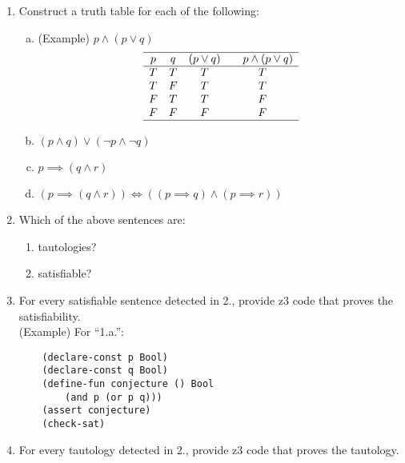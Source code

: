 \documentclass[11pt]{article}
\begin{document}
\begin{enumerate}[1.]
	\item Construct a truth table for each of the following:
	
	\begin{enumerate}[a.]
		\item (Example) $p \land (p \lor q)$
		\begin{displaymath}
		\begin{array}{cccc} \hline
		p & q & (p \lor q) & \quad p \land (p \lor q)\\
		\hline
		T & T & T & T\\
		T & F & T & T\\
		F & T & T & F\\
		F & F & F & F\\
		\hline \end{array}
		\end{displaymath}
		
		\item $(p \land q) \lor (\neg p \land \neg q)$
		
		\item $p \implies (q \land r)$
		
		\item $(p \implies (q \land r)) \Leftrightarrow ((p \implies q) \land (p \implies r))$
		
	\end{enumerate}
	\item Which of the above sentences are:
	\begin{enumerate}
		\item tautologies?
		\item satisfiable?
	\end{enumerate}
	\item For every satisfiable sentence detected in 2., provide z3 code that proves the satisfiability.\\
	(Example) For ``1.a.'':
	\begin{verbatim}
	(declare-const p Bool)
	(declare-const q Bool)
	(define-fun conjecture () Bool
	    (and p (or p q)))
	(assert conjecture)
	(check-sat)
	\end{verbatim}
	\item For every tautology detected in 2., provide z3 code that proves the tautology.
\end{enumerate}
\end{document}
